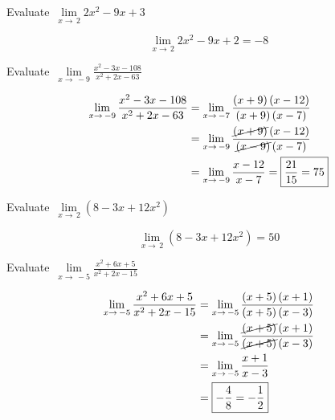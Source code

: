 \documentclass[addpoints]{exam}
\begin{document}
\begin{questions}
  \question Evaluate $\displaystyle\, \lim\limits_{x\to\,2} 2x^2-9x+3$ 
  \begin{solution}[\stretch{1}]
    \[\lim\limits_{x\to\,2} 2x^2-9x+2 = \boxed{-8}\]
  \end{solution}

  \question Evaluate $\displaystyle\, \lim\limits_{x\to\,-9} \frac{x^2-3x-108}{x^2+2x-63}$ 
  \begin{solution}[\stretch{1}]
    \begin{align*}
      \lim\limits_{x\to\,-9} \frac{x^2-3x-108}{x^2+2x-63} &= \lim\limits_{x\to\,-7} \frac{\left(x+9\right)\left(x-12\right)}{\left(x+9\right)\left(x-7\right)} \\ 
      &= \lim\limits_{x\to\,-9} \frac{\cancel{\left(x+9\right)}\left(x-12\right)}{\cancel{\left(x-9\right)}\left(x-7\right)} \\ 
      &= \lim\limits_{x\to\,-9} \frac{x-12}{x-7} = \boxed{\frac{21}{15}={7}{5}}
    \end{align*}
  \end{solution}

  \newpage

  \question Evaluate $\displaystyle\, \lim\limits_{x\to\,2} \left(8-3x+12x^2\right)$
  \begin{solution}[\stretch{1}]
    \[\lim\limits_{x\to\,2} \left(8-3x+12x^2\right) = \boxed{50}\]
  \end{solution}

  \question Evaluate $\displaystyle\, \lim\limits_{x\to\,-5} \frac{x^2+6x+5}{x^2+2x-15}$ 
  \begin{solution}[\stretch{1}]
    \begin{align*}
      \lim\limits_{x\to\,-5} \frac{x^2+6x+5}{x^2+2x-15} &= \lim\limits_{x\to\,-5} \frac{\left(x+5\right)\left(x+1\right)}{\left(x+5\right)\left(x-3\right)} \\ 
      &= \lim\limits_{x\to\,-5} \frac{\cancel{\left(x+5\right)}\left(x+1\right)}{\cancel{\left(x+5\right)}\left(x-3\right)} \\ 
      &= \lim\limits_{x\to\,-5} \frac{x+1}{x-3} \\ 
      &= \boxed{-\frac{4}{8}=-\frac{1}{2}}
    \end{align*}
  \end{solution}


\end{questions}
\end{document}
